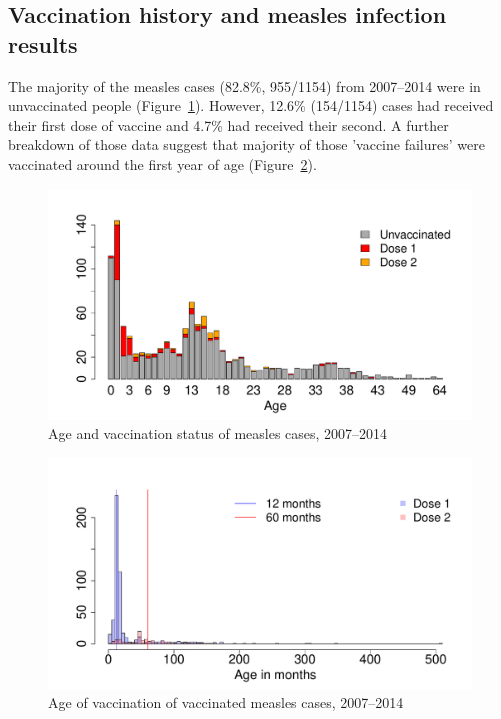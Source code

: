 \documentclass{article}
\begin{document}
\begin{itemize}
\subsection{Vaccination history and measles infection results}

The majority of the measles cases (82.8\%, 955/1154) from 2007--2014 were in unvaccinated people (Figure~\ref{fig:ageandvac}). However, 12.6\% (154/1154) cases had received their first dose of vaccine and 4.7\% had received their second. A further breakdown of those data suggest that majority of those 'vaccine failures' were vaccinated around the first year of age (Figure~\ref{fig:vaccstat}).

\begin{figure}
\begin{center}
\includegraphics{draftfinalreport-020}
\end{center}
\caption{Age and vaccination status of measles cases, 2007--2014}
\label{fig:ageandvac}
\end{figure}

\begin{figure}
\begin{center}
\includegraphics{draftfinalreport-021}
\end{center}
\caption{Age of vaccination of vaccinated measles cases, 2007--2014}
\label{fig:vaccstat}
\end{figure}


\end{itemize}
\end{document}
